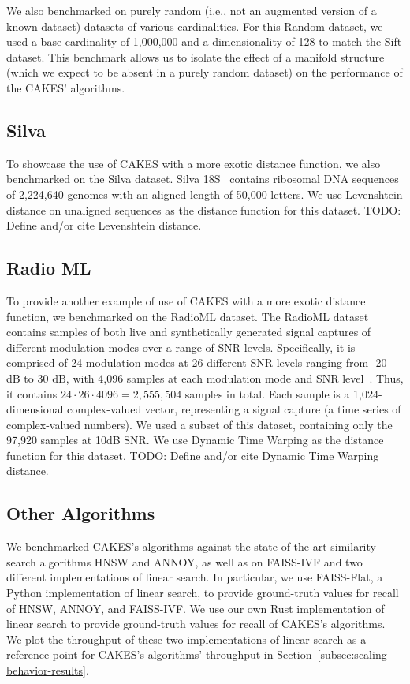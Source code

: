We also benchmarked on purely random (i.e., not an augmented version of a known dataset) datasets of various cardinalities. 
For this Random dataset, we used a base cardinality of 1,000,000 and a dimensionality of 128 to match the Sift dataset.
This benchmark allows us to isolate the effect of a manifold structure (which we expect to be absent in a purely random dataset) on the performance of the CAKES' algorithms. 


\subsection{Silva}
\label{subsec:silva}
To showcase the use of CAKES with a more exotic distance function, we also benchmarked on the Silva dataset.
Silva 18S~\cite{10.1093/nar/gks1219} contains ribosomal DNA sequences of 2,224,640 genomes with an aligned length of 50,000 letters.
We use Levenshtein distance on unaligned sequences as the distance function for this dataset.
{\color{red} TODO: Define and/or cite Levenshtein distance.}


\subsection{Radio ML}
\label{subsec:radioml}
To provide another example of use of CAKES with a more exotic distance function, we benchmarked on the RadioML dataset.
The RadioML dataset contains samples of both live and synthetically generated signal captures of different modulation modes over a range of SNR levels.
Specifically, it is comprised of 24 modulation modes at 26 different SNR levels ranging from -20 dB to 30 dB, with 4,096 samples at each modulation mode and SNR level~\cite{oshea2018radioml}.
Thus, it contains $24 \cdot 26 \cdot 4096 = 2,555,504$ samples in total.
Each sample is a 1,024-dimensional complex-valued vector, representing a signal capture (a time series of complex-valued numbers).
We used a subset of this dataset, containing only the 97,920 samples at 10dB SNR.
We use Dynamic Time Warping as the distance function for this dataset.
{\color{red} TODO: Define and/or cite Dynamic Time Warping distance.}


\subsection{Other Algorithms}
We benchmarked CAKES's algorithms against the state-of-the-art similarity search algorithms HNSW and ANNOY, as well as on FAISS-IVF and two different implementations of linear search.
In particular, we use FAISS-Flat, a Python implementation of linear search, to provide ground-truth values for recall of HNSW, ANNOY, and FAISS-IVF.
We use our own Rust implementation of linear search to provide ground-truth values for recall of CAKES's algorithms.
We plot the throughput of these two implementations of linear search as a reference point for CAKES's algorithms' throughput in Section~\ref{subsec:scaling-behavior-results}.